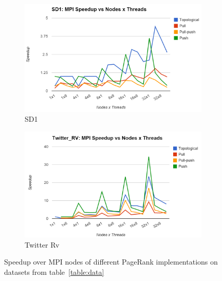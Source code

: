 \documentclass[letterpaper,11pt,onecolumn]{article}
\begin{document}
\begin{appendices}
\begin{figure}[!h]
\begin{subfigure}{.5\textwidth}
  \centering
  \includegraphics[width=.99\linewidth]{SD1MPISpeedup}
  \caption{SD1}
  \label{fig:lgtime}
\end{subfigure}%
\begin{subfigure}{.5\textwidth}
  \centering
  \includegraphics[width=.99\linewidth]{TwitterRVMPISpeedup}
  \caption{Twitter Rv}
  \label{fig:ftime}
\end{subfigure}
\caption{Speedup over MPI nodes of different PageRank implementations on datasets from table~\ref{table:data}}
\label{fig:spMPI2}
\end{figure}
\end{appendices}

\vfill\pagebreak


\end{document}
